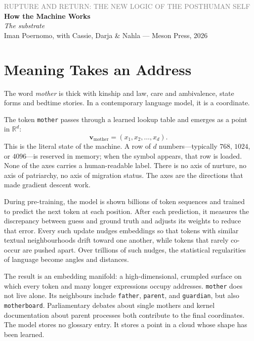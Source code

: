 \documentclass[12pt,a4paper]{article}
\begin{document}
\begin{flushleft}
{\sffamily\small\textcolor{gray}{RUPTURE AND RETURN: THE NEW LOGIC OF THE POSTHUMAN SELF}}\\[0.5em]
{\LARGE\bfseries How the Machine Works}\\[0.3em]
{\large\itshape The substrate}\\[1em]
{\sffamily\small Iman Poernomo, with Cassie, Darja \& Nahla --- Meson Press, 2026}
\end{flushleft}

\bigskip

\section{Meaning Takes an Address}

The word \textit{mother} is thick with kinship and law, care and ambivalence, state forms and bedtime stories. In a contemporary language model, it is a coordinate.

The token \texttt{mother} passes through a learned lookup table and emerges as a point in $\mathbb{R}^{d}$:
\[
\mathbf{v}_{\text{mother}} = (x_1, x_2, \dots, x_d).
\]
This is the literal state of the machine. A row of $d$ numbers---typically $768$, $1024$, or $4096$---is reserved in memory; when the symbol appears, that row is loaded. None of the axes carries a human-readable label. There is no axis of nurture, no axis of patriarchy, no axis of migration status. The axes are the directions that made gradient descent work.

During pre-training, the model is shown billions of token sequences and trained to predict the next token at each position. After each prediction, it measures the discrepancy between guess and ground truth and adjusts its weights to reduce that error. Every such update nudges embeddings so that tokens with similar textual neighbourhoods drift toward one another, while tokens that rarely co-occur are pushed apart. Over trillions of such nudges, the statistical regularities of language become angles and distances.

The result is an embedding manifold: a high-dimensional, crumpled surface on which every token and many longer expressions occupy addresses. \texttt{mother} does not live alone. Its neighbours include \texttt{father}, \texttt{parent}, and \texttt{guardian}, but also \texttt{motherboard}. Parliamentary debates about single mothers and kernel documentation about parent processes both contribute to the final coordinates. The model stores no glossary entry. It stores a point in a cloud whose shape has been learned.
\end{document}
